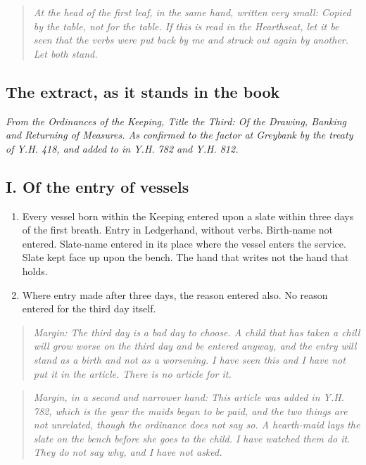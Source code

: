 \documentclass{design/chronicle}
\begin{document}
\begin{quote}\itshape \emph{At the head of the first leaf, in the same hand, written very small:} Copied by the table, not for the table. If this is read in the Hearthseat, let it be seen that the verbs were put back by me and struck out again by another. Let both stand.\end{quote}

\subsection*{The extract, as it stands in the book}

\emph{From the Ordinances of the Keeping, Title the Third: Of the Drawing, Banking and Returning of Measures. As confirmed to the factor at Greybank by the treaty of Y.H. 418, and added to in Y.H. 782 and Y.H. 812.}

\subsection*{I. Of the entry of vessels}

\begin{enumerate}[leftmargin=1.4em,itemsep=1pt,topsep=3pt,parsep=0pt]

\item Every vessel born within the Keeping entered upon a slate within three days of the first breath. Entry in Ledgerhand, without verbs. Birth-name not entered. Slate-name entered in its place where the vessel enters the service. Slate kept face up upon the bench. The hand that writes not the hand that holds.

\item Where entry made after three days, the reason entered also. No reason entered for the third day itself.

\end{enumerate}

\begin{quote}\itshape \emph{Margin:} The third day is a bad day to choose. A child that has taken a chill will grow worse on the third day and be entered anyway, and the entry will stand as a birth and not as a worsening. I have seen this and I have not put it in the article. There is no article for it.\end{quote}

\begin{quote}\itshape \emph{Margin, in a second and narrower hand:} This article was added in Y.H. 782, which is the year the maids began to be paid, and the two things are not unrelated, though the ordinance does not say so. A hearth-maid lays the slate on the bench before she goes to the child. I have watched them do it. They do not say why, and I have not asked.\end{quote}
\end{document}
